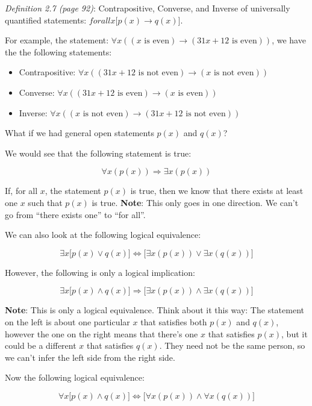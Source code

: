 \documentclass{article}
\begin{document}
\textit{Definition 2.7 (page 92)}: Contrapositive, Converse, and
Inverse of universally quantified statements:
$forall{x}\lbrack{}p(x)\rightarrow{}q(x)\rbrack$.

For example, the statement: $\forall{}x\left((\text{$x$ is even})\rightarrow(\text{$31x+12$ is even})\right)$,
we have the the following statements:

\begin{itemize}
\item Contrapositive: $\forall x\left((\text{$31x+12$ is not even})\rightarrow (\text{$x$ is not even})\right)$
\item Converse: $\forall x\left((\text{$31x+12$ is even})\rightarrow (\text{$x$ is even})\right)$
\item Inverse: $\forall{}x\left((\text{$x$ is not even})\rightarrow(\text{$31x+12$ is not even})\right)$
\end{itemize}

What if we had general open statements $p(x)$ and $q(x)$?

We would see that the following statement is true:

\[
\forall x (p(x)) \Rightarrow \exists x (p(x))
\]

If, for all $x$, the statement $p(x)$ is true, then we know that there
exists at least one $x$ such that $p(x)$ is true. \textbf{Note}: This
only goes in one direction. We can't go from ``there exists one'' to
``for all''.

We can also look at the following logical equivalence:

\[
\exists x \lbrack p(x)\vee q(x)\rbrack \Leftrightarrow \lbrack \exists x(p(x))\vee \exists x(q(x))\rbrack
\]

However, the following is only a logical implication:

\[
\exists x\lbrack p(x)\wedge q(x)\rbrack \Rightarrow \lbrack \exists x(p(x))\wedge \exists x(q(x))\rbrack
\]

\textbf{Note}: This is only a logical equivalence. Think about it this
way: The statement on the left is about one particular $x$ that
satisfies both $p(x)$ and $q(x)$, however the one on the right means
that there's one $x$ that satisfies $p(x)$, but it could be a
different $x$ that satisfies $q(x)$. They need not be the same person,
so we can't infer the left side from the right side.

Now the following logical equivalence:

\[
\forall x\lbrack p(x)\wedge q(x)\rbrack \Leftrightarrow\lbrack \forall x(p(x))\wedge \forall x(q(x))\rbrack
\]
\end{document}
